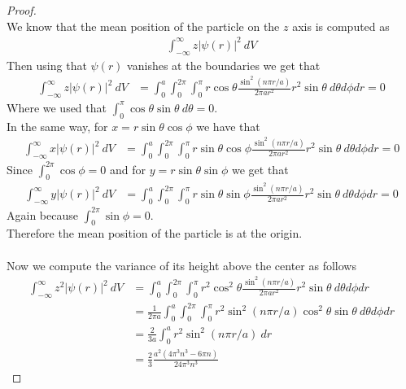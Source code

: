 \documentclass[11pt]{article}
\theoremstyle{definition}
\begin{document}
\cleardoublepage
\begin{proof}{2.5}\\
We know that the mean position of the particle on the $z$ axis is computed as
\begin{align*}
    \int_{-\infty}^\infty z|\psi(r)|^2~dV
\end{align*}
Then using that $\psi(r)$ vanishes at the boundaries we get that
\begin{align*}
    \int_{-\infty}^\infty z|\psi(r)|^2~dV
    &= \int_0^{a}\int_0^{2\pi}\int_0^\pi
    r\cos\theta\frac{\sin^2(n\pi r/a)}{2\pi a r^2}r^2\sin\theta~d\theta d\phi dr
    = 0
\end{align*}
Where we used that $\int_0^\pi \cos\theta\sin\theta~d\theta = 0$.\\
In the same way, for $x = r\sin\theta\cos\phi$ we have that
\begin{align*}
    \int_{-\infty}^\infty x|\psi(r)|^2~dV
    &= \int_0^{a}\int_0^{2\pi}\int_0^\pi
    r\sin\theta\cos\phi\frac{\sin^2(n\pi r/a)}{2\pi a r^2}r^2\sin\theta~d\theta d\phi dr
    = 0
\end{align*}
Since $\int_{0}^{2\pi} \cos\phi = 0$ and for $y = r\sin\theta\sin\phi$ we get
that
\begin{align*}
    \int_{-\infty}^\infty y|\psi(r)|^2~dV
    &= \int_0^{a}\int_0^{2\pi}\int_0^\pi
    r\sin\theta\sin\phi\frac{\sin^2(n\pi r/a)}{2\pi a r^2}r^2\sin\theta~d\theta d\phi dr
    = 0
\end{align*}
Again because $\int_{0}^{2\pi} \sin\phi = 0$.\\
Therefore the mean position of the particle is at the origin.
\\\\
Now we compute the variance of its height above the center as follows
\begin{align*}
    \int_{-\infty}^\infty z^2|\psi(r)|^2~dV
    &= \int_0^{a}\int_0^{2\pi}\int_0^\pi
    r^2\cos^2\theta\frac{\sin^2(n\pi r/a)}{2\pi a r^2}r^2\sin\theta~d\theta d\phi dr\\
    &= \frac{1}{2\pi a}\int_0^{a}\int_0^{2\pi}\int_0^\pi
    r^2\sin^2(n\pi r/a)\cos^2\theta\sin\theta~d\theta d\phi dr\\
    &= \frac{2}{3 a}\int_0^{a} r^2\sin^2(n\pi r/a)~dr\\
    &= \frac{2}{3}\frac{a^2(4\pi^3n^3 - 6\pi n)}{24\pi^3 n^3}
\end{align*}
\end{proof}
\end{document}
